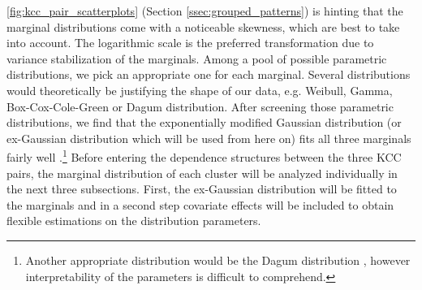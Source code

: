 
\autoref{fig:kcc_pair_scatterplots} (Section \ref{ssec:grouped_patterns}) is hinting that the marginal distributions come with a noticeable skewness, which are best to take into account. The logarithmic scale is the preferred transformation due to variance stabilization of the marginals. Among a pool of possible parametric distributions, we pick an appropriate one for each marginal. Several distributions would theoretically be justifying the shape of our data, e.g. Weibull, Gamma, Box-Cox-Cole-Green or Dagum distribution. After screening those parametric distributions, we find that the exponentially modified Gaussian distribution (or ex-Gaussian distribution which will be used from here on) fits all three marginals fairly well \citep{grushka1972characterization}.\footnote{Another appropriate distribution would be the Dagum distribution \citep{dagum1975model}, however interpretability of the parameters is difficult to comprehend.} 
Before entering the dependence structures between the three \ac{KCC} pairs, the marginal distribution of each cluster will be analyzed individually in the next three subsections. First, the ex-Gaussian distribution will be fitted to the marginals and in a second step covariate effects will be included to obtain flexible estimations on the distribution parameters.







